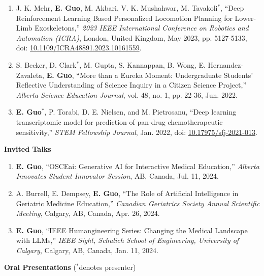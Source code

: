 \documentclass{article}
\begin{document}
\begin{enumerate}
    \item J. K. Mehr, \textbf{E. Guo}, M. Akbari, V. K. Mushahwar, M. Tavakoli$^*$, ``Deep Reinforcement Learning Based Personalized Locomotion Planning for Lower-Limb Exoskeletons,'' \textit{2023 IEEE International Conference on Robotics and Automation (ICRA)}, London, United Kingdom, May 2023, pp. 5127-5133, doi: \href{https://doi.org/10.1109/ICRA48891.2023.10161559}{10.1109/ICRA48891.2023.10161559}.
    \item S. Becker, D. Clark$^*$, M. Gupta, S. Kannappan, B. Wong, E. Hernandez-Zavaleta, \textbf{E. Guo}, ``More than a Eureka Moment: Undergraduate Students' Reflective Understanding of Science Inquiry in a Citizen Science Project,'' \textit{Alberta Science Education Journal}, vol. 48, no. 1, pp. 22-36, Jun. 2022.
    \item \textbf{E. Guo$^*$}, P. Torabi, D. E. Nielsen, and M. Pietrosanu, ``Deep learning transcriptomic model for prediction of pan-drug chemotherapeutic sensitivity,'' \textit{STEM Fellowship Journal}, Jan. 2022, doi: \href{https://doi.org/10.17975/sfj-2021-013}{10.17975/sfj-2021-013}.
\end{enumerate} \vspace{1em}

\textbf{Invited Talks} \vspace{.5em}

\begin{enumerate}
    \item \textbf{E. Guo}, ``OSCEai: Generative AI for Interactive Medical Education,'' \textit{Alberta Innovates Student Innovator Session}, AB, Canada, Jul. 11, 2024.
    \item A. Burrell, E. Dempsey, \textbf{E. Guo}, ``The Role of Artificial Intelligence in Geriatric Medicine Education,'' \textit{Canadian Geriatrics Society Annual Scientific Meeting}, Calgary, AB, Canada, Apr. 26, 2024.
    \item \textbf{E. Guo}, ``IEEE Humangineering Series: Changing the Medical Landscape with LLMs,'' \textit{IEEE Sight, Schulich School of Engineering, University of Calgary}, Calgary, AB, Canada, Jan. 11, 2024.
\end{enumerate} \vspace{1em}

\textbf{Oral Presentations} ($^*$denotes presenter) \vspace{.5em}
\end{document}
